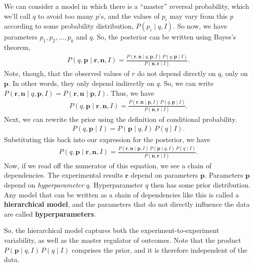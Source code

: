 We can consider a model in which there is a ``master'' reversal
probability, which we'll call $q$ to avoid too many $p$'s, and the
values of $p_i$ may vary from this $p$ according to some probability
distribution, $P(p_i\mid q, I)$.  So now, we have parameters
$p_1, p_2, \ldots, p_k$ and $q$.  So, the posterior can be written
using Bayes's theorem,
\begin{align}
P(q,\mathbf{p}\mid \mathbf{r}, \mathbf{n}, I) 
= \frac{P(\mathbf{r},\mathbf{n}\mid q, \mathbf{p}, I)\,
P(q, \mathbf{p}\mid I)}{P(\mathbf{n}, \mathbf{r}\mid I)}.
\end{align}
Note, though, that the observed values of $r$ do not depend directly
on $q$, only on $\mathbf{p}$.  In other words, they only depend
indirectly on $q$.  So, we can write
$P(\mathbf{r},\mathbf{n}\mid q, \mathbf{p}, I) =
P(\mathbf{r},\mathbf{n}\mid \mathbf{p}, I)$.  Thus, we have
\begin{align}
P(q,\mathbf{p}\mid \mathbf{r}, \mathbf{n}, I) 
= \frac{P(\mathbf{r},\mathbf{n}\mid \mathbf{p}, I)\,
P(q, \mathbf{p}\mid I)}{P(\mathbf{n}, \mathbf{r}\mid I)}.
\end{align}
Next, we can rewrite the prior using the definition of conditional
probability.
\begin{align}
P(q,\mathbf{p}\mid I) = P(\mathbf{p}\mid q,I)\, P(q\mid I).
\end{align}
Substituting this back into our expression for the posterior, we have
\begin{align}
P(q,\mathbf{p}\mid \mathbf{r}, \mathbf{n}, I) 
= \frac{P(\mathbf{r},\mathbf{n}\mid \mathbf{p}, I)\,
P(\mathbf{p}\mid q,I)\, P(q\mid I)}{P(\mathbf{n}, \mathbf{r}\mid I)}.
\end{align}
Now, if we read off the numerator of this equation, we see a chain of
dependencies.  The experimental results $\mathbf{r}$ depend on
parameters $\mathbf{p}$.  Parameters $\mathbf{p}$ depend on
\textit{hyperparameter} $q$.  Hyperparameter $q$ then has some prior
distribution.  Any model that can be written as a chain of
dependencies like this is called a \textbf{hierarchical model}, and
the parameters that do not directly influence the data are called
\textbf{hyperparameters}.

So, the hierarchical model captures both the experiment-to-experiment
variability, as well as the master regulator of outcomes.  Note that
the product $P(\mathbf{p}\mid q,I)\, P(q\mid I)$ comprises the prior,
and it is therefore independent of the data.



